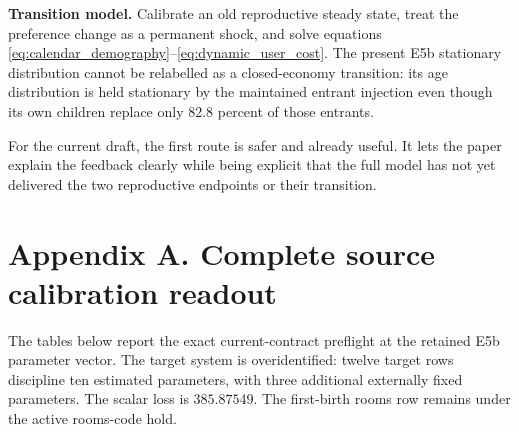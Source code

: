 \documentclass[11pt]{article}
\begin{document}
\textbf{Transition model.}  Calibrate an old reproductive steady state, treat
the preference change as a permanent shock, and solve equations
\eqref{eq:calendar_demography}--\eqref{eq:dynamic_user_cost}.  The present E5b
stationary distribution cannot be relabelled as a closed-economy transition:
its age distribution is held stationary by the maintained entrant injection
even though its own children replace only 82.8 percent of those entrants.

For the current draft, the first route is safer and already useful.  It lets the
paper explain the feedback clearly while being explicit that the full model has
not yet delivered the two reproductive endpoints or their transition.

\clearpage
\section*{Appendix A. Complete source calibration readout}

The tables below report the exact current-contract preflight at the retained
E5b parameter vector.  The target system is overidentified: twelve target rows
discipline ten estimated parameters, with three additional externally fixed
parameters.  The scalar loss is $385.87549$.  The first-birth rooms row remains
under the active rooms-code hold.
\end{document}
